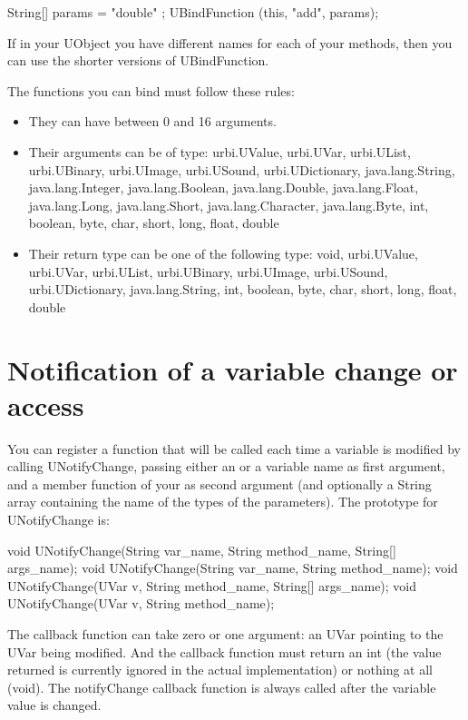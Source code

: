 \begin{cxx}
String[] params = { "double" };
UBindFunction (this, "add", params);
\end{cxx}

If in your UObject you have different names for each of your methods, then
you can use the shorter versions of UBindFunction.

The functions you can bind must follow these rules:
\begin{itemize}
\item They can have between 0 and 16 arguments.
\item Their arguments can be of type: urbi.UValue, urbi.UVar, urbi.UList,
  urbi.UBinary, urbi.UImage, urbi.USound, urbi.UDictionary,
  java.lang.String, java.lang.Integer, java.lang.Boolean, java.lang.Double,
  java.lang.Float, java.lang.Long, java.lang.Short, java.lang.Character,
  java.lang.Byte, int, boolean, byte, char, short, long, float, double
\item Their return type can be one of the following type: void, urbi.UValue,
  urbi.UVar, urbi.UList, urbi.UBinary, urbi.UImage, urbi.USound,
  urbi.UDictionary, java.lang.String, int, boolean, byte, char, short, long,
  float, double
\end{itemize}


\section{Notification of a variable change or access}
\label{sec:uob:apijava:uvar-notify}

You can register a function that will be called each time a variable is
modified by calling UNotifyChange, passing either an \UVar or a variable
name as first argument, and a member function of your \UObject as second
argument (and optionally a String array containing the name of the types of
the parameters). The prototype for UNotifyChange is:

\begin{java}
void UNotifyChange(String var_name, String method_name, String[] args_name);
void UNotifyChange(String var_name, String method_name);
void UNotifyChange(UVar v, String method_name, String[] args_name);
void UNotifyChange(UVar v, String method_name);
\end{java}

The callback function can take zero or one argument: an UVar pointing to the
UVar being modified. And the callback function must return an int (the value
returned is currently ignored in the actual implementation) or nothing at
all (void).  The notifyChange callback function is always called after the
variable value is changed.

